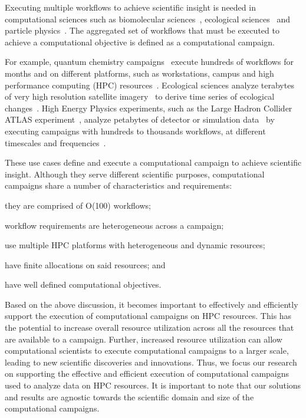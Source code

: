
Executing multiple workflows to achieve scientific insight is needed in
computational sciences such as biomolecular sciences~\cite{cheatham2015impact,
dakka2018concurrent}, ecological sciences~\cite{goncalves2020sealnet,
paraskevakos2019workflow} and particle physics~\cite{atlas}. The aggregated
set of workflows that must be executed to achieve a computational objective is
defined as a computational campaign.

For example, quantum chemistry campaigns~\cite{smith2020molssi} execute hundreds
of workflows for months and on different platforms, such as workstations, campus
and high performance computing (HPC) resources~\cite{smith2020molssi}.
Ecological sciences analyze terabytes of very high resolution satellite
imagery~\cite{goncalves2020sealnet} to derive time series of ecological
changes~\cite{paraskevakos2019workflow}. High Energy Physics experiments, such
as the Large Hadron Collider ATLAS experiment~\cite{atlas}, analyze petabytes of
detector or simulation data~\cite{borodin2015big} by executing campaigns with
hundreds to thousands workflows, at different timescales and
frequencies~\cite{borodin2015big}.

These use cases define and execute a computational campaign to achieve
scientific insight. Although they serve different scientific purposes,
computational campaigns share a number of characteristics and requirements:
\begin{inparaenum}[(1)]
    \item they are comprised of O(100) workflows;
    \item workflow requirements are heterogeneous across a campaign;
    \item use multiple HPC platforms with heterogeneous and dynamic resources;
    \item have finite allocations on said resources; and
    \item have well defined computational objectives.
\end{inparaenum}

Based on the above discussion, it becomes important to effectively and
efficiently support the execution of computational campaigns on HPC resources.
This has the potential to increase overall resource utilization across all the
resources that are available to a campaign. Further, increased resource
utilization can allow computational scientists to execute computational
campaigns to a larger scale, leading to new scientific discoveries and
innovations. Thus, we focus our research on supporting the effective and
efficient execution of computational campaigns used to analyze data on HPC
resources. It is important to note that our solutions and results are agnostic
towards the scientific domain and size of the computational campaigns. 

